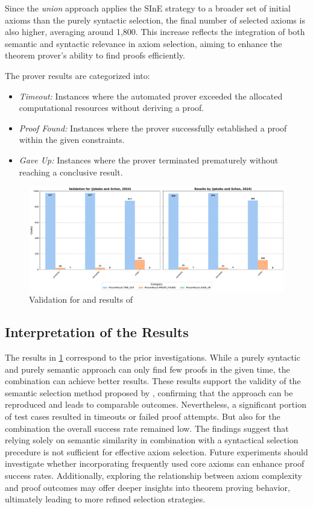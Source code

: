 \documentclass[english,version-2020-11]{uzl-thesis}
\begin{document}
Since the \textit{union} approach applies the SInE strategy to a broader set of initial axioms than the purely syntactic selection, the final number of selected axioms is also higher, averaging around 1,800. This increase reflects the integration of both semantic and syntactic relevance in axiom selection, aiming to enhance the theorem prover’s ability to find proofs efficiently.

The prover results are categorized into:
\begin{itemize}
    \item \textit{Timeout:} Instances where the automated prover exceeded the allocated computational resources without deriving a proof.
    \item \textit{Proof Found:} Instances where the prover successfully established a proof within the given constraints.
    \item \textit{Gave Up:} Instances where the prover terminated prematurely without reaching a conclusive result.
\end{itemize}

\begin{figure}[ht]
    \centering
    \includegraphics[width=\textwidth]{comparison_output.pdf}
    \caption{Validation for and results of \cite{Schon2024}}
    \label{fig:reengineering}
\end{figure}

\subsection{Interpretation of the Results}

The results in \ref{fig:reengineering} correspond to the prior investigations. While a purely syntactic and purely semantic approach can only find few proofs in the given time, the combination can achieve better results.
These results support the validity of the semantic selection method proposed by \cite{Schon2024}, confirming that the approach can be reproduced and leads to comparable outcomes.
Nevertheless, a significant portion of test cases resulted in timeouts or failed proof attempts. But also for the combination the overall success rate remained low.
The findings suggest that relying solely on semantic similarity in combination with a syntactical selection precedure is not sufficient for effective axiom selection. Future experiments should investigate whether incorporating frequently used core axioms can enhance proof success rates. Additionally, exploring the relationship between axiom complexity and proof outcomes may offer deeper insights into theorem proving behavior, ultimately leading to more refined selection strategies.
\end{document}
